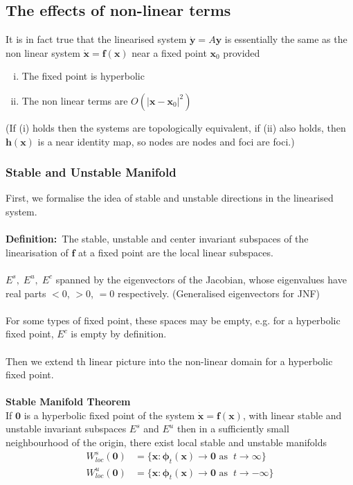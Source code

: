 \documentclass{article}
\newcommand{\definition}{\textbf{Definition:}}              %
\newcommand{\bp}{\bm{\phi}}                                 %
\begin{document}
\subsection{The effects of non-linear terms}
It is in fact true that the linearised system $\dot{\bm{y}} = A \bm{y}$
is essentially the same as the non linear system $\dot{\bm{x}} = \bm{f}(\bm{x})$
near a fixed point $\bm{x}_0$ provided
\begin{enumerate}[(i)]
\item The fixed point is hyperbolic
\item The non linear terms are $O( |\bm{x} - \bm{x}_0|^2)$
\end{enumerate}
(If (i) holds then the systems are topologically equivalent, if (ii) also holds,
then $\bm{h}(\bm{x})$ is a near identity map, so nodes are nodes and foci are
foci.)
\subsubsection{Stable and Unstable Manifold}
First, we formalise the idea of stable and unstable directions in the linearised
system.
\\
\\
\definition\ The stable, unstable and center invariant subspaces of the
linearisation of $\bm{f}$ at a fixed point are the local linear subspaces.
\\
\\
$E^s, \; E^u, \; E^c$ spanned by the eigenvectors of the Jacobian, whose 
eigenvalues have real parts $<0$, $ >0$,  $=0$ respectively. (Generalised
eigenvectors for JNF)
\\
\\
For some types of fixed point, these spaces may be empty, e.g. for a hyperbolic
fixed point, $E^c$ is empty by definition.
\\
\\
Then we extend th linear picture into the non-linear domain for a hyperbolic
fixed point.
\\
\\
\textbf{Stable Manifold Theorem}
\\
If $\bm{0}$ is a hyperbolic fixed point of the system $\dot{\bm{x}} = \bm{f}(\bm{x})$,
with linear stable and unstable invariant subspaces $E^s$ and $E^u$ then in a 
sufficiently small neighbourhood of the origin, there exist local stable and
unstable manifolds
\begin{align*}
W^s_{loc}(\bm{0}) &= \{ \bm{x} : \bp_t(\bm{x}) \to \bm{0} \mbox{ as } \
t \to \infty \} \\
W^u_{loc}(\bm{0}) &= \{ \bm{x} : \bp_t(\bm{x}) \to \bm{0} \mbox{ as } \
t \to -\infty \} 
\end{align*}
\end{document}
